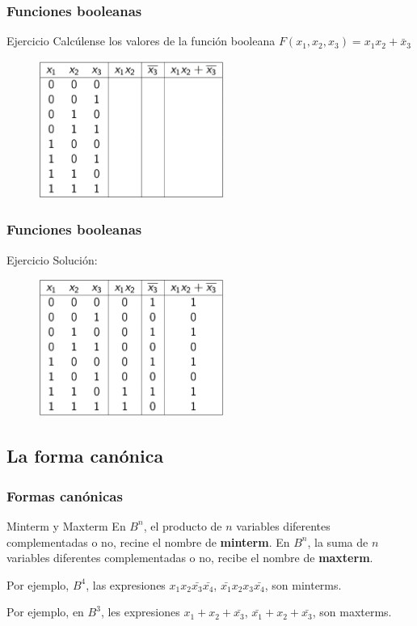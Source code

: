 \documentclass{beamer}
\begin{document}
\begin{frame}
\frametitle{Funciones booleanas}
\begin{block}{Ejercicio}
Calc\'ulense los valores de la funci\'on booleana $F(x_1,x_2,x_3) = x_1x_2 + \bar x_3$
\begin{figure}[h]
\label{fig:volumen}
\centering
\includegraphics[height=4.5cm]{ex5_1}
\end{figure}

\end{block}
\end{frame}

\begin{frame}
\frametitle{Funciones booleanas}
\begin{block}{Ejercicio}
Soluci\'on:
\begin{figure}[h]
\label{fig:volumen}
\centering
\includegraphics[height=4.5cm]{ex5_2}
\end{figure}

\end{block}
\end{frame}

\subsection{La forma can\'onica}

\begin{frame}
\frametitle{Formas can\'onicas}
\begin{block}{Minterm y Maxterm}
En $B^n$, el producto de $n$ variables diferentes complementadas o no, recine el nombre de \textbf{minterm}.
En $B^n$, la suma de $n$ variables diferentes complementadas o no, recibe el nombre de \textbf{maxterm}.
\end{block}
Por ejemplo, $B^4$, las expresiones $x_1x_2\bar{x_3}\bar{x_4}$, $\bar{x_1}x_2x_3\bar{x_4}$, son minterms.

Por ejemplo, en $B^3$, les expresiones $x_1+x_2+\bar{x_3}$, $\bar{x_1}+x_2+\bar{x_3}$, son maxterms.
\end{frame}
\end{document}

